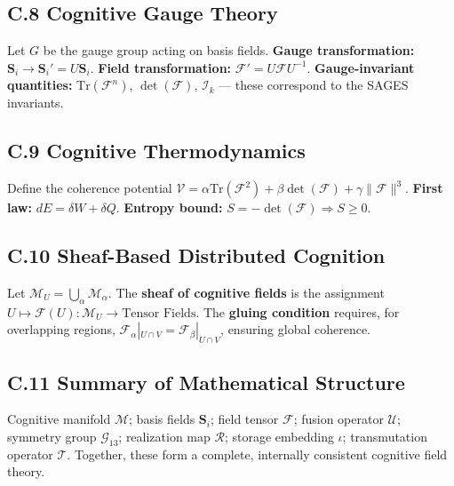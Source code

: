 \subsection{C.8 Cognitive Gauge Theory}\label{c.8-cognitive-gauge-theory}

Let \(G\) be the gauge group acting on basis fields. \textbf{Gauge transformation:} \(\mathbf{S}_i \rightarrow \mathbf{S}_i' = U \mathbf{S}_i\). \textbf{Field transformation:} \(\mathcal{F}' = U \mathcal{F} U^{-1}\). \textbf{Gauge-invariant quantities:} \(\mathrm{Tr}(\mathcal{F}^n)\), \(\det(\mathcal{F})\), \(\mathcal{I}_k\) --- these correspond to the SAGES invariants.

\subsection{C.9 Cognitive Thermodynamics}\label{c.9-cognitive-thermodynamics}

Define the coherence potential \(\mathcal{V} = \alpha \mathrm{Tr}(\mathcal{F}^2) + \beta \det(\mathcal{F}) + \gamma \|\mathcal{F}\|^3\). \textbf{First law:} \(dE = \delta W + \delta Q\). \textbf{Entropy bound:} \(S = -\det(\mathcal{F}) \Rightarrow S \ge 0\).

\subsection{C.10 Sheaf-Based Distributed Cognition}\label{c.10-sheaf-based-distributed-cognition}

Let \(\mathcal{M}_U = \bigcup_\alpha \mathcal{M}_\alpha\). The \textbf{sheaf of cognitive fields} is the assignment \(U \mapsto \mathcal{F}(U) : \mathcal{M}_U \rightarrow \text{Tensor Fields}\). The \textbf{gluing condition} requires, for overlapping regions, \(\mathcal{F}_\alpha|_{U \cap V} = \mathcal{F}_\beta|_{U \cap V}\), ensuring global coherence.

\subsection{C.11 Summary of Mathematical Structure}\label{c.11-summary-of-mathematical-structure}

Cognitive manifold \(\mathcal{M}\); basis fields \(\mathbf{S}_i\); field tensor \(\mathcal{F}\); fusion operator \(\mathcal{U}\); symmetry group \(\mathcal{G}_{13}\); realization map \(\mathcal{R}\); storage embedding \(\iota\); transmutation operator \(\mathcal{T}\). Together, these form a complete, internally consistent cognitive field theory.
